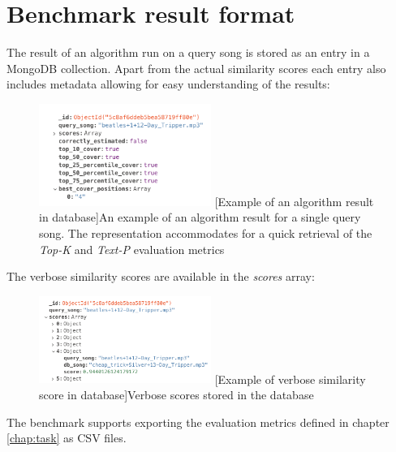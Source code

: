 \section{Benchmark result format} 
\label{sec:resformat}

The result of an algorithm run on a query song is stored as an entry in a
MongoDB collection. Apart from the actual similarity scores each entry also
includes metadata allowing for easy understanding of the results:

\begin{figure}[H]
   \centering 
   \includegraphics[width=0.5\textwidth]{Benchmark/overallresult.png}
   [Example of an algorithm result in database]{An example of an algorithm result for a single query song. The representation accommodates for a quick retrieval of the \textit{Top-K} and \textit{Text-P} evaluation metrics}
   \label{fig:overallresult}
\end{figure}

The verbose similarity scores are available in the \textit{scores} array:

\begin{figure}[H]
    \centering
    \includegraphics[width=0.5\textwidth]{Benchmark/scoresresult.png}
    [Example of verbose similarity score in database]{Verbose scores stored in the database}
    \label{fig:scoresresult}
\end{figure}

The benchmark supports exporting the evaluation metrics defined in chapter
\ref{chap:task} as CSV files.